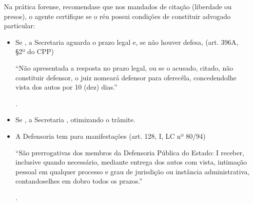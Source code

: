 \documentclass[letterpaper,10pt,brazil]{sphinxmanual}
\begin{document}
\sphinxAtStartPar
Na prática forense, recomenda\sphinxhyphen{}se que nos mandados de citação (liberdade ou presos), o agente certifique se o réu possui condições de constituir advogado particular:
\begin{itemize}
\item {} 
\sphinxAtStartPar
Se , a Secretaria aguarda o prazo legal e, se não houver defesa,  (art. 396\sphinxhyphen{}A, \S{}2º do CPP)%
\begin{footnote}[3]\sphinxAtStartFootnote
{} \textendash{} “Não apresentada a resposta no prazo legal, ou se o acusado, citado, não constituir defensor, o juiz nomeará defensor para oferecê\sphinxhyphen{}la, concedendo\sphinxhyphen{}lhe vista dos autos por 10 (dez) dias.”
%
\end{footnote}.

\item {} 
\sphinxAtStartPar
Se , a Secretaria , otimizando o trâmite.

\item {} 
\sphinxAtStartPar
A Defensoria tem  para manifestações (art. 128, I, LC nº 80/94)%
\begin{footnote}[4]\sphinxAtStartFootnote
{} \textendash{} “São prerrogativas dos membros da Defensoria Pública do Estado: I \textendash{} receber, inclusive quando necessário, mediante entrega dos autos com vista, intimação pessoal em qualquer processo e grau de jurisdição ou instância administrativa, contando\sphinxhyphen{}se\sphinxhyphen{}lhes em dobro todos os prazos.”
%
\end{footnote}.

\end{itemize}
\end{document}
